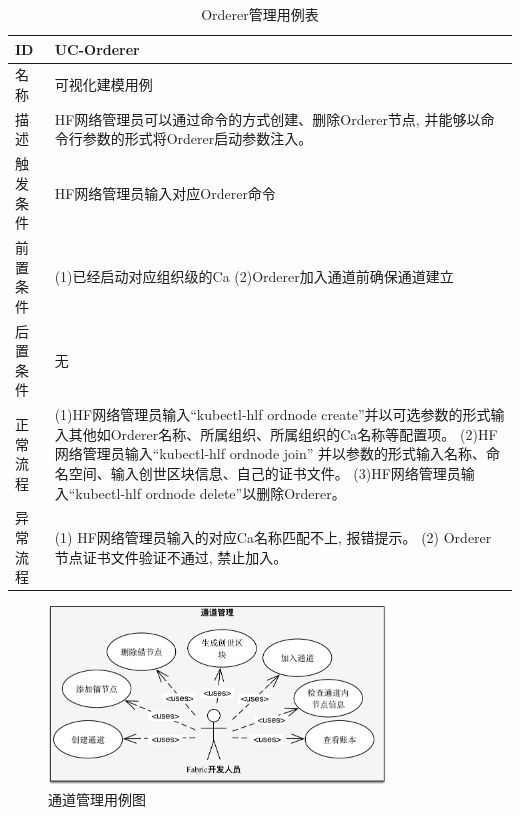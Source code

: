 {\footnotesize
\begin{longtable}[h]{m{60pt}|m{280pt}}
    \caption[Orderer管理用例表]{Orderer管理用例表} \label{orderer_use_case} \\
        \hline  
        ID&UC-Orderer\\
        \hline
        名称&可视化建模用例\\
        \hline
        描述&HF网络管理员可以通过命令的方式创建、删除Orderer节点, 并能够以命令行参数的形式将Orderer启动参数注入。\\
        \hline
        触发条件&HF网络管理员输入对应Orderer命令\\
        \hline
        前置条件& (1)已经启动对应组织级的Ca
        \newline (2)Orderer加入通道前确保通道建立\\
        \hline
        后置条件&无\\
        \hline
        正常流程& (1)HF网络管理员输入“kubectl-hlf ordnode create”并以可选参数的形式输入其他如Orderer名称、所属组织、所属组织的Ca名称等配置项。
        \newline (2)HF网络管理员输入“kubectl-hlf ordnode join” 并以参数的形式输入名称、命名空间、输入创世区块信息、自己的证书文件。
        \newline (3)HF网络管理员输入“kubectl-hlf ordnode delete”以删除Orderer。\\
        \hline 
        异常流程& (1) HF网络管理员输入的对应Ca名称匹配不上, 报错提示。
        \newline (2) Orderer节点证书文件验证不通过, 禁止加入。 \\
        \hline
    \end{longtable} 
}


\begin{figure}[!htbp] %
    \centering %
    \includegraphics[width=0.8\textwidth]{FIGs/chapter4/chan_usecase.pdf} %
    \caption{通道管理用例图} %
    \label{chan_use_case_pic} %
\end{figure}%

